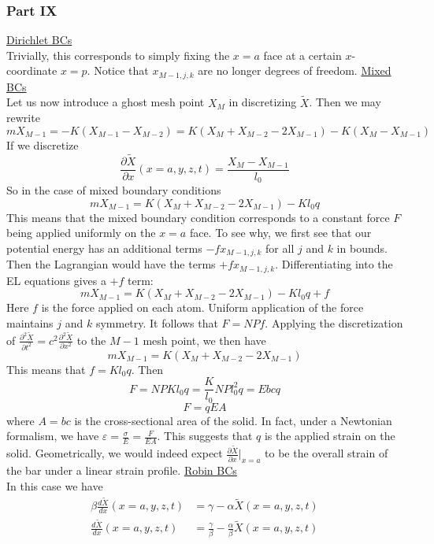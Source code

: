 \documentclass[letterpaper,12pt]{article}
\newcommand*{\deriv}[2]{\frac{d #1}{d #2}}
\newcommand*{\pderiv}[2]{\frac{\partial #1}{\partial #2}}
\newcommand*{\npderiv}[3]{\frac{\partial^{#3} #1}{\partial #2^{#3}}}
\begin{document}
\begin{flushleft}
    \subsubsection*{Part IX}
    \underline{Dirichlet BCs}\\
    Trivially, this corresponds to simply fixing the $x=a$ face at a certain $x$-coordinate $x=p$. Notice that $x_{M-1,j,k}$ are no longer degrees of freedom.\newline\newline
    \underline{Mixed BCs}\\
    Let us now introduce a ghost mesh point $X_M$ in discretizing $\tilde{X}$. Then we may rewrite
    $$mX_{M-1} = -K(X_{M-1} - X_{M-2}) = K(X_{M} + X_{M-2} - 2X_{M-1}) - K(X_M - X_{M-1})$$
    If we discretize
    $$\pderiv{\tilde{X}}{x}(x=a,y,z,t) = \frac{X_M - X_{M-1}}{l_0}$$
    So in the case of mixed boundary conditions
    $$mX_{M-1} = K(X_{M} + X_{M-2} - 2X_{M-1}) - Kl_0q$$
    This means that the mixed boundary condition corresponds to a constant force $F$ being applied uniformly on the $x=a$ face. To see why, we first see that our potential energy has an additional terms $-fx_{M-1,j,k}$ for all $j$ and $k$ in bounds. Then the Lagrangian would have the terms $+fx_{M-1,j,k}$. Differentiating into the EL equations gives a $+f$ term:
    $$mX_{M-1} = K(X_{M} + X_{M-2} - 2X_{M-1}) - Kl_0q + f$$
    Here $f$ is the force applied on each atom. Uniform application of the force maintains $j$ and $k$ symmetry. It follows that $F = NPf$. Applying the discretization of $\npderiv{\tilde{X}}{t}{2} = c^2\npderiv{\tilde{X}}{x}{2}$ to the $M-1$ mesh point, we then have
    $$mX_{M-1} = K(X_{M} + X_{M-2} - 2X_{M-1})$$
    This means that $f = Kl_0q$. Then
    $$F = NPKl_0q = \frac{K}{l_0}NPl_0^2q = Ebcq$$
    $$\boxed{F = qEA}$$
    where $A = bc$ is the cross-sectional area of the solid. In fact, under a Newtonian formalism, we have $\varepsilon = \frac{\sigma}{E} = \frac{F}{EA}$. This suggests that $q$ is the applied strain on the solid. Geometrically, we would indeed expect $\pderiv{\tilde{X}}{x}\big|_{x=a}$ to be the overall strain of the bar under a linear strain profile.\newline\newline
    \underline{Robin BCs}\\
    In this case we have
    \begin{align*}
        \beta\deriv{\tilde{X}}{x}(x=a,y,z,t) &= \gamma - \alpha\tilde{X}(x=a,y,z,t) \\
        \deriv{\tilde{X}}{x}(x=a,y,z,t) &= \frac{\gamma}{\beta} - \frac{\alpha}{\beta}\tilde{X}(x=a,y,z,t)

\end{align*}
\end{flushleft}
\end{document}
